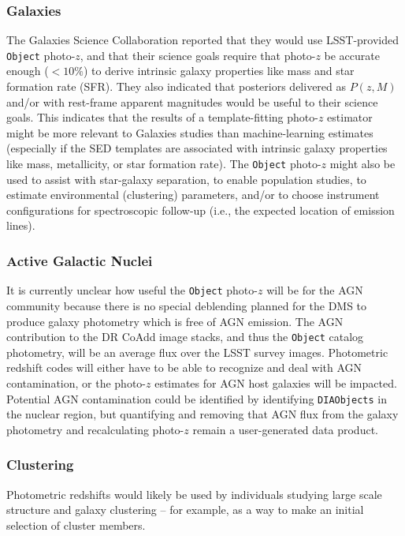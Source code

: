 \documentclass[DM,lsstdraft,toc]{lsstdoc}
\begin{document}
\subsubsection{Galaxies}\label{sssec:use_sci_gal}
The Galaxies Science Collaboration reported that they would use LSST-provided {\tt Object} photo-$z$, and that their science goals require that photo-$z$ be accurate enough ($<10\%$) to derive intrinsic galaxy properties like mass and star formation rate (SFR).
They also indicated that posteriors delivered as $P(z,M)$ and/or with rest-frame apparent magnitudes would be useful to their science goals.
This indicates that the results of a template-fitting photo-$z$ estimator might be more relevant to Galaxies studies than machine-learning estimates (especially if the SED templates are associated with intrinsic galaxy properties like mass, metallicity, or star formation rate).
The {\tt Object} photo-$z$ might also be used to assist with star-galaxy separation, to enable population studies, to estimate environmental (clustering) parameters, and/or to choose instrument configurations for spectroscopic follow-up (i.e., the expected location of emission lines).

\subsubsection{Active Galactic Nuclei}\label{sssec:use_sci_agn}
It is currently unclear how useful the {\tt Object} photo-$z$ will be for the AGN community because there is no special deblending planned for the DMS to produce galaxy photometry which is free of AGN emission.
The AGN contribution to the DR CoAdd image stacks, and thus the {\tt Object} catalog photometry, will be an average flux over the LSST survey images.
Photometric redshift codes will either have to be able to recognize and deal with AGN contamination, or the photo-$z$ estimates for AGN host galaxies will be impacted.
Potential AGN contamination could be identified by identifying {\tt DIAObjects} in the nuclear region, but quantifying and removing that AGN flux from the galaxy photometry and recalculating photo-$z$ remain a user-generated data product.

\subsubsection{Clustering}\label{sssec:use_sci_clust}
Photometric redshifts would likely be used by individuals studying large scale structure and galaxy clustering -- for example, as a way to make an initial selection of cluster members.
\end{document}
